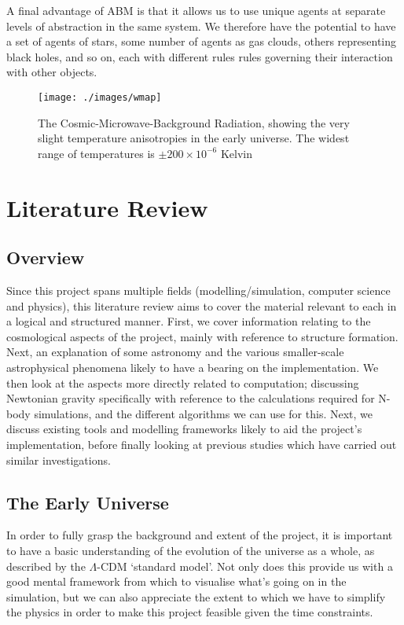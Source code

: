 \documentclass[11pt,a4paper]{article}
\begin{document}
A final advantage of ABM is that it allows us to use unique agents at separate levels of abstraction in the same system. We therefore have the potential to have a set of agents of stars, some number of agents as gas clouds, others representing black holes, and so on, each with different rules rules governing their interaction with other objects.
 
\begin{figure}[h!]
\centering
\texttt{[image: ./images/wmap]}
\caption[Cosmic-Microwave-Background Radiation map]{The Cosmic-Microwave-Background Radiation, showing the very slight temperature anisotropies in the early universe. The widest range of temperatures is $\pm 200\times10^{-6}$ Kelvin \cite{nasaWMAP}}
\label{cmbrImg}
\end{figure}

\section{Literature Review}

\subsection{Overview}
Since this project spans multiple fields (modelling/simulation, computer science and physics), this literature review aims to cover the material relevant to each in a logical and structured manner. First, we cover information relating to the cosmological aspects of the project, mainly with reference to structure formation. Next, an explanation of some astronomy and the various smaller-scale astrophysical phenomena likely to have a bearing on the implementation. We then look at the aspects more directly related to computation; discussing Newtonian gravity specifically with reference to the calculations required for N-body simulations, and the different algorithms we can use for this. Next, we discuss existing tools and modelling frameworks likely to aid the project's implementation, before finally looking at previous studies which have carried out similar investigations.

\subsection{The Early Universe}
\label{earlyUniverse}
In order to fully grasp the background and extent of the project, it is important to have a basic understanding of the evolution of the universe as a whole, as described by the $\Lambda$-CDM `standard model'. Not only does this provide us with a good mental framework from which to visualise what's going on in the simulation, but we can also appreciate the extent to which we have to simplify the physics in order to make this project feasible given the time constraints.
\end{document}
